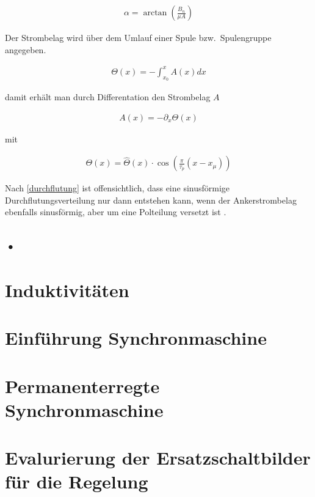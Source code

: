 \begin{align}
\alpha = \arctan(\frac{B_n}{\mu A}) \label{strombelagwinkel}
\end{align}

Der Strombelag wird über dem Umlauf einer Spule bzw.\ Spulengruppe angegeben.

\begin{align}
\Theta(x) = - \int_{x_0}^{x} A(x)dx \label{durchflutung}
\end{align}

damit erhält man durch Differentation den Strombelag $A$

\begin{align}
A(x) = -\partial_x \Theta(x) \label{Strombelag}
\end{align}

mit

\begin{align}
\Theta(x) = \hat{\Theta}(x)\cdot \cos(\frac{\pi}{\tau_p}(x-x_\mu)) \label{adurchflutung}
\end{align}

Nach \ref{durchflutung} ist offensichtlich, dass eine sinusförmige Durchflutungsverteilung nur dann entstehen kann, wenn der Ankerstrombelag ebenfalls sinusförmig, aber um eine Polteilung versetzt ist \parencite[S.~247]{mullerI2005}.


\subsection{•}

\section{Induktivitäten}\label{sec:induktiv}

\section{Einführung Synchronmaschine}\label{sec:synchron}

\section{Permanenterregte Synchronmaschine}\label{sec:pmsm}

\section{Evalurierung der Ersatzschaltbilder für die Regelung}\label{sec:esb}



